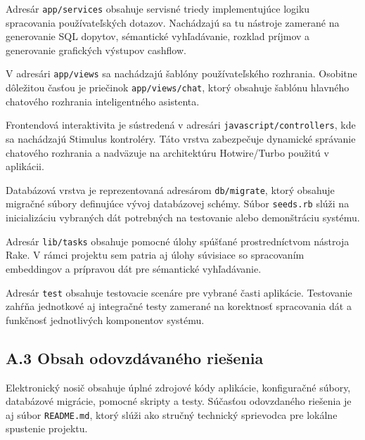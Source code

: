 Adresár \texttt{app/services} obsahuje servisné triedy implementujúce logiku spracovania
používateľských dotazov. Nachádzajú sa tu nástroje zamerané na generovanie SQL
dopytov, sémantické vyhľadávanie, rozklad príjmov a generovanie grafických
výstupov cashflow.

V adresári \texttt{app/views} sa nachádzajú šablóny používateľského rozhrania.
Osobitne dôležitou časťou je priečinok \texttt{app/views/chat}, ktorý obsahuje
šablónu hlavného chatového rozhrania inteligentného asistenta.

Frontendová interaktivita je sústredená v adresári \texttt{javascript/controllers},
kde sa nachádzajú Stimulus kontroléry. Táto vrstva zabezpečuje dynamické správanie
chatového rozhrania a nadväzuje na architektúru Hotwire/Turbo použitú v aplikácii.

Databázová vrstva je reprezentovaná adresárom \texttt{db/migrate}, ktorý obsahuje
migračné súbory definujúce vývoj databázovej schémy. Súbor \texttt{seeds.rb} slúži
na inicializáciu vybraných dát potrebných na testovanie alebo demonštráciu systému.

Adresár \texttt{lib/tasks} obsahuje pomocné úlohy spúšťané prostredníctvom
nástroja Rake. V rámci projektu sem patria aj úlohy súvisiace so spracovaním embeddingov
a prípravou dát pre sémantické vyhľadávanie.

Adresár \texttt{test} obsahuje testovacie scenáre pre vybrané časti aplikácie. Testovanie
zahŕňa jednotkové aj integračné testy zamerané na korektnosť spracovania dát a funkčnosť
jednotlivých komponentov systému.

\subsection*{A.3 Obsah odovzdávaného riešenia}

Elektronický nosič obsahuje úplné zdrojové kódy aplikácie, konfiguračné súbory,
databázové migrácie, pomocné skripty a testy. Súčasťou odovzdaného riešenia je
aj súbor \texttt{README.md}, ktorý slúži ako stručný technický sprievodca pre
lokálne spustenie projektu.